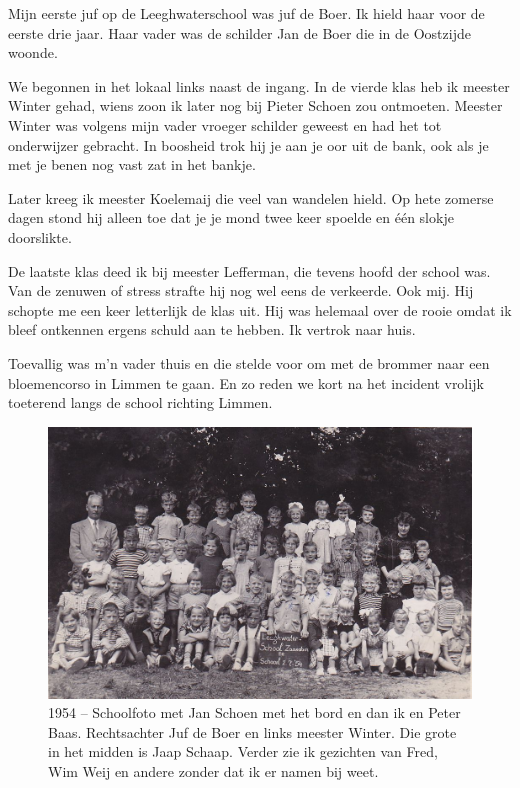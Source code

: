 \documentclass[10pt,twoside, openright]{memoir}
\begin{document}
Mijn eerste juf op de Leeghwaterschool was juf de Boer. Ik hield haar voor de eerste drie jaar. Haar vader was de schilder Jan de Boer die in de Oostzijde woonde. 

We begonnen in het lokaal links naast de ingang. In de vierde klas heb ik meester Winter gehad, wiens zoon ik later nog bij Pieter Schoen zou ontmoeten. Meester Winter was volgens mijn vader vroeger schilder geweest en had het tot onderwijzer gebracht. In boosheid trok hij je aan je oor uit de bank, ook als je met je benen nog vast zat in het bankje. 

Later kreeg ik meester Koelemaij die veel van wandelen hield. Op hete zomerse dagen stond hij alleen toe dat je je mond twee keer spoelde en één slokje doorslikte. 

De laatste klas deed ik bij meester Lefferman, die tevens hoofd der school was. Van de zenuwen of stress strafte hij nog wel eens de verkeerde. Ook mij. Hij schopte me een keer letterlijk de klas uit. Hij was helemaal over de rooie omdat ik bleef ontkennen ergens schuld aan te hebben. Ik vertrok naar huis. 

Toevallig was m’n vader thuis en die stelde voor om met de brommer naar een bloemencorso in Limmen te gaan. En zo reden we kort na het incident vrolijk toeterend langs de school richting Limmen. 

\begin{figure}
\includegraphics[width=\textwidth]{img/ch18/lwschool}
\caption*{\footnotesize 1954 – Schoolfoto met Jan Schoen met het bord en dan ik en Peter Baas. Rechtsachter Juf de Boer en links meester Winter. Die grote in het midden is Jaap Schaap. Verder zie ik gezichten van Fred, Wim Weij en andere zonder dat ik er namen bij weet.}
\end{figure}
\end{document}
